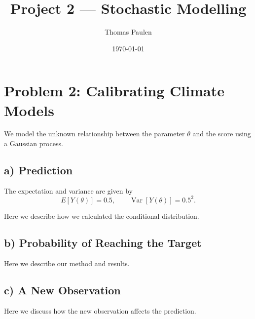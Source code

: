 \documentclass[a4paper,11pt]{article}
\title{Project 2 — Stochastic Modelling}
\author{Thomas Paulen}
\date{\today}
\begin{document}
\maketitle

\section{Problem 2: Calibrating Climate Models}

We model the unknown relationship between the parameter
$\theta$ and the score using a Gaussian process.

\subsection{a) Prediction}

The expectation and variance are given by
\[
    E[Y(\theta)] = 0.5,
    \qquad
    \operatorname{Var}[Y(\theta)] = 0.5^2.
\]

Here we describe how we calculated the conditional distribution.

\subsection{b) Probability of Reaching the Target}

Here we describe our method and results.

\subsection{c) A New Observation}

Here we discuss how the new observation
affects the prediction.
\end{document}
